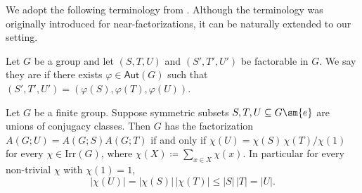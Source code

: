 \documentclass{file}
\newcommand{\Aut}{\mathsf{Aut}}
\begin{document}
We adopt the following terminology from \cite[§1]{KreherPatersonStinson2025}.
Although the terminology was originally introduced for near-factorizations, it can be naturally extended to our setting.

\begin{defn}
Let $G$ be a group and let $(S,T,U)$ and $(S',T',U')$ be factorable in $G$.
We say they are  if there exists $\varphi\in\Aut(G)$ such that
$(S',T',U')=(\varphi(S),\varphi(T),\varphi(U))$.
\end{defn}




\begin{thm}\label{thm:normal}
Let $G$ be a finite group. 
Suppose symmetric subsets $S,T,U\subseteq G\sm\{e\}$ are unions of conjugacy classes. Then $G$ has the factorization
$A(G;U)=A(G;S)A(G;T)$ if and only if $\chi(U)=\chi(S)\,\chi(T)/\chi(1)$ for every $\chi\in\mathrm{Irr}(G)$,
where $\chi(X)\coloneqq\sum_{x\in X}\chi(x)$. In particular for every non-trivial $\chi$ with $\chi(1)=1$,
\[
|\chi(U)|=|\chi(S)|\,|\chi(T)|\le |S|\,|T|=|U|.
\]
\end{thm}
\end{document}
